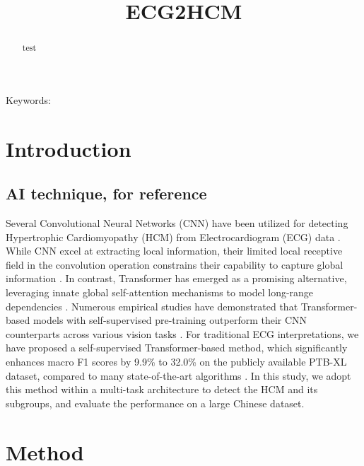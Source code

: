 \documentclass[11pt]{article}
\title{ECG2HCM}
\date{}
\theoremstyle{definition}
\begin{document}
\maketitle


\begin{abstract}
test
\end{abstract}
Keywords: 

\section*{Introduction}
\label{sec:intro}

\subsection*{AI technique, for reference}
Several Convolutional Neural Networks (CNN) have been utilized for detecting Hypertrophic Cardiomyopathy (HCM) from Electrocardiogram (ECG) data \citep{ko2020detection, goto2022multinational, siontis2023saliency,  siontis2024hypertrophic}. While CNN excel at extracting local information, their limited local receptive field in the convolution operation constrains their capability to capture global information \citep{song2022ctmfnet, yang2021transformer}. In contrast, Transformer has emerged as a promising alternative, leveraging innate global self-attention mechanisms to model long-range dependencies \citep{vaswani2017attention, dosovitskiy2020image}. Numerous empirical studies have demonstrated that Transformer-based models with self-supervised pre-training outperform their CNN counterparts across various vision tasks \citep{matsoukas2021time}. For traditional ECG interpretations, we have proposed a self-supervised Transformer-based method, which significantly enhances macro F1 scores by 9.9\% to 32.0\% on the publicly available PTB-XL dataset, compared to many state-of-the-art algorithms \citep{wagner2020ptb, zhou2023masked}. 
In this study, we adopt this method within a multi-task architecture to detect the HCM and its subgroups, and evaluate the performance on a large Chinese dataset. 



\section*{Method}
\label{sec:method}
\end{document}
